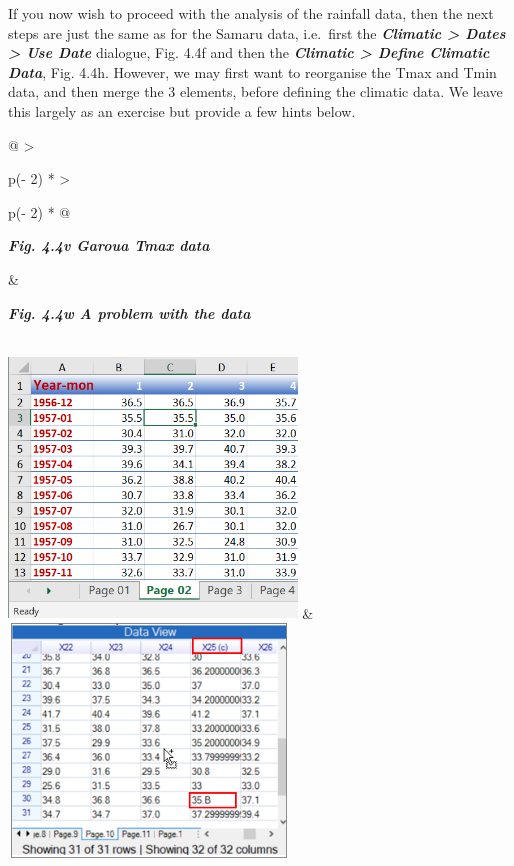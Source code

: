 \documentclass[
  letterpaper,
  DIV=11,
  numbers=noendperiod]{scrreprt}
\begin{document}
If you now wish to proceed with the analysis of the rainfall data, then
the next steps are just the same as for the Samaru data, i.e.~first the
\textbf{\emph{Climatic \textgreater{} Dates \textgreater{} Use Date}}
dialogue, Fig. 4.4f and then the \textbf{\emph{Climatic \textgreater{}
Define Climatic Data}}, Fig. 4.4h. However, we may first want to
reorganise the Tmax and Tmin data, and then merge the 3 elements, before
defining the climatic data. We leave this largely as an exercise but
provide a few hints below.

\begin{longtable}[]{@{}
  >{\raggedright\arraybackslash}p{(\columnwidth - 2\tabcolsep) * }
  >{\raggedright\arraybackslash}p{(\columnwidth - 2\tabcolsep) * }@{}}
\toprule\noalign{}
\begin{minipage}[b]{\linewidth}\raggedright
\textbf{\emph{Fig. 4.4v Garoua Tmax data}}
\end{minipage} & \begin{minipage}[b]{\linewidth}\raggedright
\textbf{\emph{Fig. 4.4w A problem with the data}}
\end{minipage} \\
\midrule\noalign{}
\endhead
\bottomrule\noalign{}
\endlastfoot
\includegraphics[width=3.0164in,height=2.72469in]{figures/Fig4.4v.png} &
\includegraphics[width=2.94236in,height=2.44857in]{figures/Fig4.4w.png} \\
\end{longtable}
\end{document}
